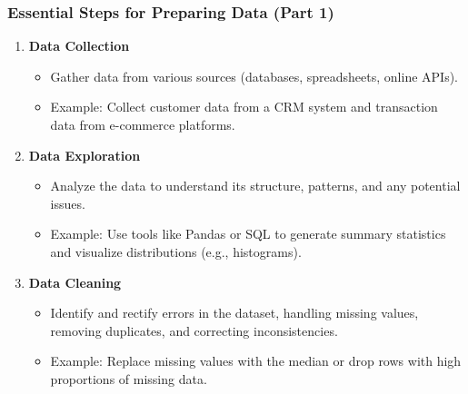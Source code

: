 \documentclass[aspectratio=169]{beamer}
\begin{document}
\begin{frame}[fragile]
    \frametitle{Essential Steps for Preparing Data (Part 1)}
    \begin{enumerate}
        \item \textbf{Data Collection}  
            \begin{itemize}
                \item Gather data from various sources (databases, spreadsheets, online APIs).
                \item Example: Collect customer data from a CRM system and transaction data from e-commerce platforms.
            \end{itemize}
        
        \item \textbf{Data Exploration}  
            \begin{itemize}
                \item Analyze the data to understand its structure, patterns, and any potential issues.
                \item Example: Use tools like Pandas or SQL to generate summary statistics and visualize distributions (e.g., histograms).
            \end{itemize}

        \item \textbf{Data Cleaning}
            \begin{itemize}
                \item Identify and rectify errors in the dataset, handling missing values, removing duplicates, and correcting inconsistencies.
                \item Example: Replace missing values with the median or drop rows with high proportions of missing data.
            \end{itemize}
    \end{enumerate}
\end{frame}
\end{document}
